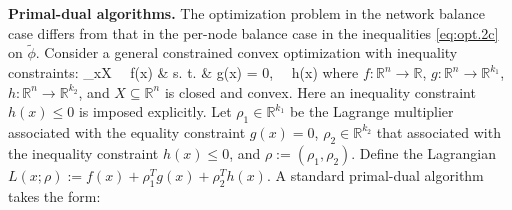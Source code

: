 \vspace{0.1in}
\noindent
\textbf{Primal-dual algorithms.}
The optimization problem in the network balance case differs from that in the per-node balance case
in the inequalities \eqref{eq:opt.2c} on $\tilde\phi$.
Consider a general constrained convex optimization with inequality constraints:
\bqn
\min_{x\in X} \ \ f(x) & s. t. & g(x) = 0, \ \ h(x)
\eqn
where $f:\mathbb R^n\rightarrow \mathbb R$, $g:\mathbb R^n\rightarrow \mathbb R^{k_1}$, $h:\mathbb R^n\rightarrow \mathbb R^{k_2}$,
and $X\subseteq \mathbb R^n$ is closed and convex. 
Here an inequality constraint $h(x)\le 0$ is imposed explicitly. 
Let $\rho_1\in\mathbb R^{k_1}$ be the Lagrange multiplier associated
with the equality constraint $g(x)=0$, $\rho_2\in\mathbb R^{k_2}$ that associated with the inequality 
constraint $h(x)\le 0$, and $\rho := (\rho_1, \rho_2)$.  
Define the Lagrangian $L(x; \rho) := f(x) + \rho_1^T g(x)+ \rho_2^T h(x)$.
A standard primal-dual algorithm takes the form:
%
